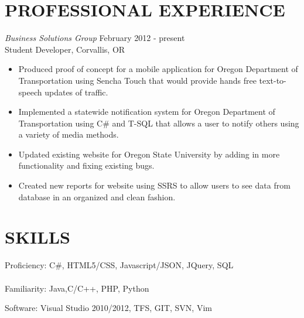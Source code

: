 \documentclass{res}
\begin{document}
\begin{resume}
\vspace{0.2in}
\section{PROFESSIONAL EXPERIENCE}
\vspace{8pt}
{\sl Business Solutions Group} \hfill        February 2012 - present \\
Student Developer, Corvallis, OR

   \begin{itemize} \itemsep -2pt %
   \item Produced proof of concept for a mobile application for Oregon Department of Transportation using Sencha Touch that would provide hands free text-to-speech updates of traffic.
   \item Implemented a statewide notification system for Oregon Department of Transportation using C\# and T-SQL that allows a user to notify others using a variety of media methods.
   \item Updated existing website for Oregon State University by adding in more functionality and fixing existing bugs.
   \item Created new reports for website using SSRS to allow users to see data from database in an organized and clean fashion.
 \end{itemize}
\vspace{0.2in}
\section{SKILLS}
\vspace{8pt}
Proficiency: C\#, HTML5/CSS, Javascript/JSON, JQuery, SQL
\\
\\
Familiarity: Java,C/C++, PHP, Python

Software: Visual Studio 2010/2012, TFS, GIT, SVN, Vim

\end{resume}
\end{document}
